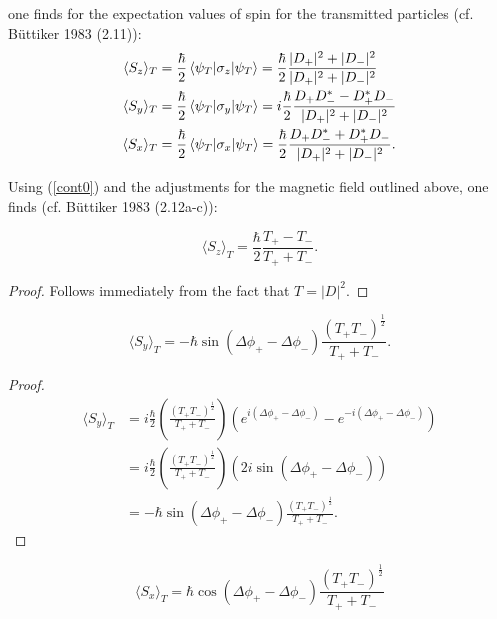 \documentclass{article}
\begin{document}
\noindent one finds for the expectation values of spin for the transmitted particles (cf. B{\"u}ttiker 1983 (2.11)):
\begin{subequations}
\begin{align}
	\langle S_z \rangle_T &= \frac{\hbar}{2}\braket{\psi_T|\sigma_z|\psi_T}=\frac{\hbar}{2}\frac{|D_+|^2+|D_-|^2}{|D_+|^2+|D_-|^2} \\
	\langle S_y \rangle_T &= \frac{\hbar}{2}\braket{\psi_T|\sigma_y|\psi_T}=i\frac{\hbar}{2}\frac{D_+D_-^*-D_+^*D_-}{|D_+|^2+|D_-|^2} \\
	\langle S_x \rangle_T &= \frac{\hbar}{2}\braket{\psi_T|\sigma_x|\psi_T}=\frac{\hbar}{2}\frac{D_+D_-^*+D_+^*D_-}{|D_+|^2+|D_-|^2}.
\end{align}
\end{subequations}

\noindent Using (\ref{cont0}) and the adjustments for the magnetic field outlined above, one finds (cf. B{\"u}ttiker 1983 (2.12a-c)):

\begin{equation}
	\langle S_z \rangle_T = \frac{\hbar}{2}\frac{T_+-T_-}{T_++T_-}.
	\label{szT}
\end{equation}


\begin{proof}
Follows immediately from the fact that $T=|D|^2$.
\end{proof}

\begin{equation}
	\langle S_y \rangle_T = -\hbar \sin{(\Delta\phi_+-\Delta\phi_-)}\frac{(T_+T_-)^{\frac{1}{2}}}{T_++T_-}.
	\label{syT}
\end{equation}

\begin{proof}
\begin{subequations}
\begin{align}
	\langle S_y \rangle_T &= i\frac{\hbar}{2}\left(\frac{(T_+T_-)^{\frac{1}{2}}}{T_++T_-}\right)\left(e^{i(\Delta\phi_+-\Delta\phi_-)}-e^{-i(\Delta\phi_+-\Delta\phi_-)}\right) \\
			    &= i\frac{\hbar}{2}\left(\frac{(T_+T_-)^{\frac{1}{2}}}{T_++T_-}\right)(2i\sin{(\Delta\phi_+-\Delta\phi_-)}) \\
			    &=-\hbar \sin{(\Delta\phi_+-\Delta\phi_-)}\frac{(T_+T_-)^{\frac{1}{2}}}{T_++T_-}.
\end{align}
\end{subequations}
\end{proof}

\begin{equation}
	\langle S_x \rangle_T = \hbar \cos{(\Delta\phi_+-\Delta\phi_-)}\frac{(T_+T_-)^{\frac{1}{2}}}{T_++T_-}
	\label{sxT}
\end{equation}
\end{document}
